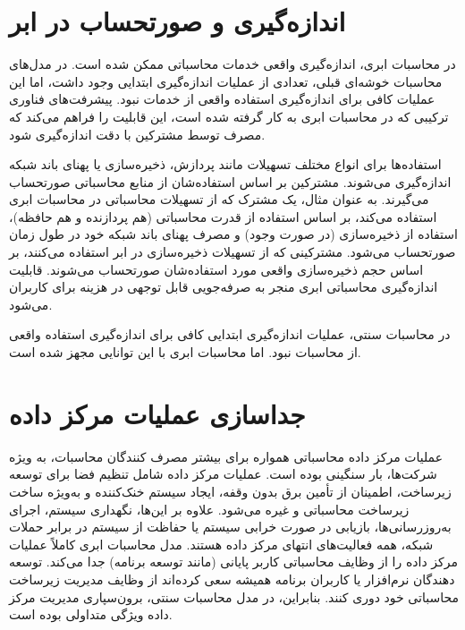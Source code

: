 \documentclass{book}
\begin{document}
        \section{اندازه‌گیری و صورتحساب در ابر}

            در محاسبات ابری، اندازه‌گیری واقعی خدمات محاسباتی ممکن شده است. در مدل‌های محاسبات خوشه‌ای قبلی، تعدادی از عملیات اندازه‌گیری ابتدایی وجود داشت، اما این عملیات کافی برای اندازه‌گیری استفاده واقعی از خدمات نبود. پیشرفت‌های فناوری ترکیبی که در محاسبات ابری به کار گرفته شده است، این قابلیت را فراهم می‌کند که مصرف توسط مشترکین با دقت اندازه‌گیری شود.

            استفاده‌ها برای انواع مختلف تسهیلات مانند پردازش، ذخیره‌سازی یا پهنای باند شبکه اندازه‌گیری می‌شوند. مشترکین بر اساس استفاده‌شان از منابع محاسباتی صورتحساب می‌گیرند. به عنوان مثال، یک مشترک که از تسهیلات محاسباتی در محاسبات ابری استفاده می‌کند، بر اساس استفاده از قدرت محاسباتی (هم پردازنده و هم حافظه)، استفاده از ذخیره‌سازی (در صورت وجود) و مصرف پهنای باند شبکه خود در طول زمان صورتحساب می‌شود. مشترکینی که از تسهیلات ذخیره‌سازی در ابر استفاده می‌کنند، بر اساس حجم ذخیره‌سازی واقعی مورد استفاده‌شان صورتحساب می‌شوند. قابلیت اندازه‌گیری محاسباتی ابری منجر به صرفه‌جویی قابل توجهی در هزینه برای کاربران می‌شود.

            \begin{addinfo}
                
                در محاسبات سنتی، عملیات اندازه‌گیری ابتدایی کافی برای اندازه‌گیری استفاده واقعی از محاسبات نبود. اما محاسبات ابری با این توانایی مجهز شده است.

            \end{addinfo}

        \section{جداسازی عملیات مرکز داده}

            عملیات مرکز داده محاسباتی همواره برای بیشتر مصرف کنندگان محاسبات، به ویژه شرکت‌ها، بار سنگینی بوده است. عملیات مرکز داده شامل تنظیم فضا برای توسعه زیرساخت، اطمینان از تأمین برق بدون وقفه، ایجاد سیستم خنک‌کننده و به‌ویژه ساخت زیرساخت محاسباتی و غیره می‌شود. علاوه بر این‌ها، نگهداری سیستم، اجرای به‌روزرسانی‌ها، بازیابی در صورت خرابی سیستم یا حفاظت از سیستم در برابر حملات شبکه، همه فعالیت‌های انتهای مرکز داده هستند. مدل محاسبات ابری کاملاً عملیات مرکز داده را از وظایف محاسباتی کاربر پایانی (مانند توسعه برنامه) جدا می‌کند. توسعه دهندگان نرم‌افزار یا کاربران برنامه همیشه سعی کرده‌اند از وظایف مدیریت زیرساخت محاسباتی خود دوری کنند. بنابراین، در مدل محاسبات سنتی، برون‌سپاری مدیریت مرکز داده ویژگی متداولی بوده است.
\end{document}
